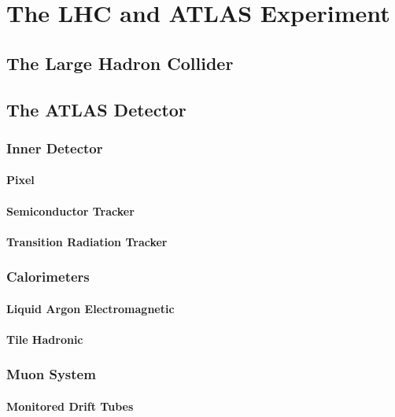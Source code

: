 \chapter{The LHC and ATLAS Experiment}

\section{The Large Hadron Collider}

\section{The ATLAS Detector}

	\subsection{Inner Detector}

		\subsubsection{Pixel}

		\subsubsection{Semiconductor Tracker}

		\subsubsection{Transition Radiation Tracker}

	\subsection{Calorimeters}

		\subsubsection{Liquid Argon Electromagnetic}

		\subsubsection{Tile Hadronic}

	\subsection{Muon System}

		\subsubsection{Monitored Drift Tubes}

